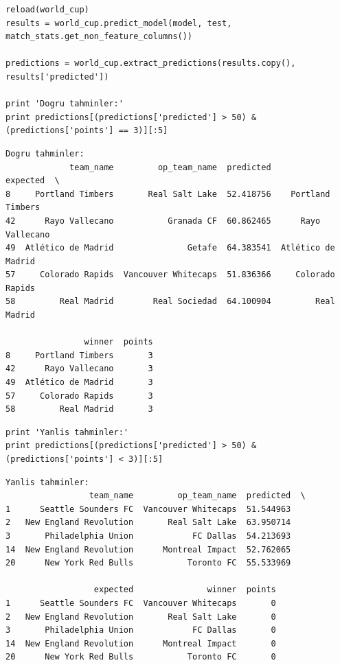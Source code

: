 \documentclass[12pt,fleqn]{article}\usepackage{../common}
\begin{document}
\begin{verbatim}
reload(world_cup)
results = world_cup.predict_model(model, test, match_stats.get_non_feature_columns())

predictions = world_cup.extract_predictions(results.copy(), results['predicted'])

print 'Dogru tahminler:'
print predictions[(predictions['predicted'] > 50) & (predictions['points'] == 3)][:5]
\end{verbatim}

\begin{verbatim}
Dogru tahminler:
             team_name         op_team_name  predicted            expected  \
8     Portland Timbers       Real Salt Lake  52.418756    Portland Timbers   
42      Rayo Vallecano           Granada CF  60.862465      Rayo Vallecano   
49  Atlético de Madrid               Getafe  64.383541  Atlético de Madrid   
57     Colorado Rapids  Vancouver Whitecaps  51.836366     Colorado Rapids   
58         Real Madrid        Real Sociedad  64.100904         Real Madrid   

                winner  points  
8     Portland Timbers       3  
42      Rayo Vallecano       3  
49  Atlético de Madrid       3  
57     Colorado Rapids       3  
58         Real Madrid       3  
\end{verbatim}

\begin{verbatim}
print 'Yanlis tahminler:'
print predictions[(predictions['predicted'] > 50) & (predictions['points'] < 3)][:5]
\end{verbatim}

\begin{verbatim}
Yanlis tahminler:
                 team_name         op_team_name  predicted  \
1      Seattle Sounders FC  Vancouver Whitecaps  51.544963   
2   New England Revolution       Real Salt Lake  63.950714   
3       Philadelphia Union            FC Dallas  54.213693   
14  New England Revolution      Montreal Impact  52.762065   
20      New York Red Bulls           Toronto FC  55.533969   

                  expected               winner  points  
1      Seattle Sounders FC  Vancouver Whitecaps       0  
2   New England Revolution       Real Salt Lake       0  
3       Philadelphia Union            FC Dallas       0  
14  New England Revolution      Montreal Impact       0  
20      New York Red Bulls           Toronto FC       0  
\end{verbatim}
\end{document}
